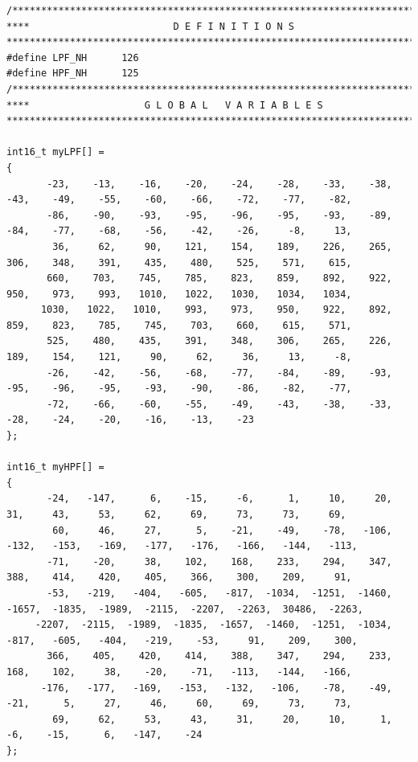 \documentclass[11pt,pdftex,portrait,letterpaper]{article}
\begin{document}
\begin{lstlisting}[caption={filters.h}, label=l:program4]
/*******************************************************************************
****                         D E F I N I T I O N S
*******************************************************************************/
#define LPF_NH		126
#define HPF_NH		125
/*******************************************************************************
****                    G L O B A L   V A R I A B L E S
*******************************************************************************/

int16_t myLPF[] =
{
       -23,    -13,    -16,    -20,    -24,    -28,    -33,    -38,    -43,    -49,    -55,    -60,    -66,    -72,    -77,    -82,
       -86,    -90,    -93,    -95,    -96,    -95,    -93,    -89,    -84,    -77,    -68,    -56,    -42,    -26,     -8,     13,
        36,     62,     90,    121,    154,    189,    226,    265,    306,    348,    391,    435,    480,    525,    571,    615,
       660,    703,    745,    785,    823,    859,    892,    922,    950,    973,    993,   1010,   1022,   1030,   1034,   1034,
      1030,   1022,   1010,    993,    973,    950,    922,    892,    859,    823,    785,    745,    703,    660,    615,    571,
       525,    480,    435,    391,    348,    306,    265,    226,    189,    154,    121,     90,     62,     36,     13,     -8,
       -26,    -42,    -56,    -68,    -77,    -84,    -89,    -93,    -95,    -96,    -95,    -93,    -90,    -86,    -82,    -77,
       -72,    -66,    -60,    -55,    -49,    -43,    -38,    -33,    -28,    -24,    -20,    -16,    -13,    -23
};

int16_t myHPF[] =
{
       -24,   -147,      6,    -15,     -6,      1,     10,     20,     31,     43,     53,     62,     69,     73,     73,     69,
        60,     46,     27,      5,    -21,    -49,    -78,   -106,   -132,   -153,   -169,   -177,   -176,   -166,   -144,   -113,
       -71,    -20,     38,    102,    168,    233,    294,    347,    388,    414,    420,    405,    366,    300,    209,     91,
       -53,   -219,   -404,   -605,   -817,  -1034,  -1251,  -1460,  -1657,  -1835,  -1989,  -2115,  -2207,  -2263,  30486,  -2263,
     -2207,  -2115,  -1989,  -1835,  -1657,  -1460,  -1251,  -1034,   -817,   -605,   -404,   -219,    -53,     91,    209,    300,
       366,    405,    420,    414,    388,    347,    294,    233,    168,    102,     38,    -20,    -71,   -113,   -144,   -166,
      -176,   -177,   -169,   -153,   -132,   -106,    -78,    -49,    -21,      5,     27,     46,     60,     69,     73,     73,
        69,     62,     53,     43,     31,     20,     10,      1,     -6,    -15,      6,   -147,    -24
};


\end{lstlisting}
\end{document}

